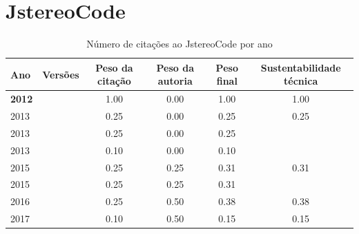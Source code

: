 \section{JstereoCode}


\begin{table}[H]
\caption{Número de citações ao JstereoCode por ano}
\centering
\begin{tabular}{| l | c | c | c | c | c |}
  \hline
  Ano & Versões & Peso da citação & Peso da autoria & Peso final & Sustentabilidade técnica \\
  \hline
            {\bf 2012}
          &
          
          &
          1.00
          &
          0.00
          &
          1.00
          &
            {\color{blue} 1.00}
          \\
\hline
            2013
          &
          
          &
          0.25
          &
          0.00
          &
          0.25
          &
            {\color{red} 0.25}
          \\
            2013
          &
          
          &
          0.25
          &
          0.00
          &
          0.25
          &
          \\
            2013
          &
          
          &
          0.10
          &
          0.00
          &
          0.10
          &
          \\
\hline
            2015
          &
          
          &
          0.25
          &
          0.25
          &
          0.31
          &
            {\color{red} 0.31}
          \\
            2015
          &
          
          &
          0.25
          &
          0.25
          &
          0.31
          &
          \\
\hline
            2016
          &
          
          &
          0.25
          &
          0.50
          &
          0.38
          &
            {\color{red} 0.38}
          \\
\hline
            2017
          &
          
          &
          0.10
          &
          0.50
          &
          0.15
          &
            {\color{red} 0.15}
          \\
\hline
\end{tabular}
\end{table}



